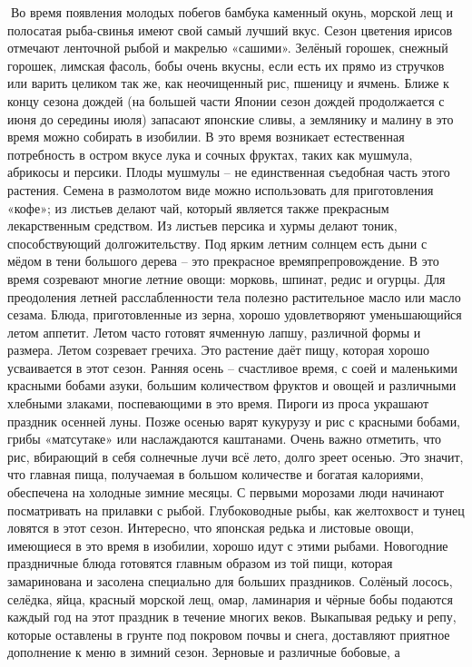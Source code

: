 \documentclass[a4paper]{book}
\begin{document}
Во время появления молодых побегов бамбука каменный окунь, морской лещ и
полосатая рыба-свинья имеют свой самый лучший вкус. Сезон цветения ирисов отмечают
ленточной рыбой и макрелью «сашими». Зелёный горошек, снежный горошек, лимская
фасоль, бобы очень вкусны, если есть их прямо из стручков или варить целиком так же, как
неочищенный рис, пшеницу и ячмень.
Ближе к концу сезона дождей (на большей части Японии сезон дождей продолжается с
июня до середины июля) запасают японские сливы, а землянику и малину в это время можно
собирать в изобилии. В это время возникает естественная потребность в остром вкусе лука и
сочных фруктах, таких как мушмула, абрикосы и персики. Плоды мушмулы – не
единственная съедобная часть этого растения. Семена в размолотом виде можно
использовать для приготовления «кофе»; из листьев делают чай, который является также
прекрасным лекарственным средством. Из листьев персика и хурмы делают тоник,
способствующий долгожительству.
Под ярким летним солнцем есть дыни с мёдом в тени большого дерева – это прекрасное
времяпрепровождение. В это время созревают многие летние овощи: морковь, шпинат, редис
и огурцы. Для преодоления летней расслабленности тела полезно растительное масло или
масло сезама. Блюда, приготовленные из зерна, хорошо удовлетворяют уменьшающийся
летом аппетит. Летом часто готовят ячменную лапшу, различной формы и размера. Летом
созревает гречиха. Это растение даёт пищу, которая хорошо усваивается в этот сезон.
Ранняя осень – счастливое время, с соей и маленькими красными бобами азуки,
большим количеством фруктов и овощей и различными хлебными злаками, поспевающими в
это время. Пироги из проса украшают праздник осенней луны. Позже осенью варят кукурузу
и рис с красными бобами, грибы «матсутаке» или наслаждаются каштанами. Очень важно
отметить, что рис, вбирающий в себя солнечные лучи всё лето, долго зреет осенью. Это
значит, что главная пища, получаемая в большом количестве и богатая калориями,
обеспечена на холодные зимние месяцы.
С первыми морозами люди начинают посматривать на прилавки с рыбой.
Глубоководные рыбы, как желтохвост и тунец ловятся в этот сезон. Интересно, что японская
редька и листовые овощи, имеющиеся в это время в изобилии, хорошо идут с этими рыбами.
Новогодние праздничные блюда готовятся главным образом из той пищи, которая
замаринована и засолена специально для больших праздников. Солёный лосось, селёдка,
яйца, красный морской лещ, омар, ламинария и чёрные бобы подаются каждый год на этот
праздник в течение многих веков.
Выкапывая редьку и репу, которые оставлены в грунте под покровом почвы и снега,
доставляют приятное дополнение к меню в зимний сезон. Зерновые и различные бобовые, а
\end{document}
